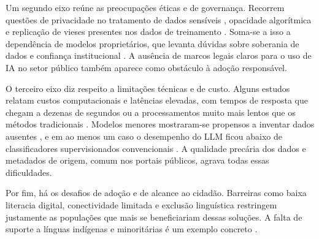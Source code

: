Um segundo eixo reúne as preocupações éticas e de governança. Recorrem questões de privacidade no tratamento de dados sensíveis \citep{Ingole2024}, opacidade algorítmica e replicação de vieses presentes nos dados de treinamento \citep{Monsalvo2025,Freitas_Silva_2026}. Soma-se a isso a dependência de modelos proprietários, que levanta dúvidas sobre soberania de dados e confiança institucional \citep{ScotlandChatGPT2024,ExpertMultiAgent2025}. A ausência de marcos legais claros para o uso de IA no setor público também aparece como obstáculo à adoção responsável.

O terceiro eixo diz respeito a limitações técnicas e de custo. Alguns estudos relatam custos computacionais e latências elevadas, com tempos de resposta que chegam a dezenas de segundos \citep{HybridGraphRAG2025} ou a processamentos muito mais lentos que os métodos tradicionais \citep{MakingPDFsAccessible2023}. Modelos menores mostraram-se propensos a inventar dados ausentes \citep{EvaluatingLLMsOGD2025}, e em ao menos um caso o desempenho do LLM ficou abaixo de classificadores supervisionados convencionais \citep{Baron2023}. A qualidade precária dos dados e metadados de origem, comum nos portais públicos, agrava todas essas dificuldades.

Por fim, há os desafios de adoção e de alcance ao cidadão. Barreiras como baixa literacia digital, conectividade limitada e exclusão linguística restringem justamente as populações que mais se beneficiariam dessas soluções. A falta de suporte a línguas indígenas e minoritárias é um exemplo concreto \citep{ExpertMultiAgent2025,Rakhimova2025}. 
